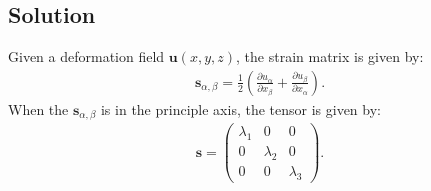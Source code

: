 \documentclass{article}
\begin{document}
\subsection*{Solution}
Given a deformation field $\mathbf{u}(x,y,z)$, the strain matrix is given by:
\begin{align*}
    \mathbf{s}_{\alpha,\beta} = \frac{1}{2}\left(\frac{\partial u_\alpha}{\partial x_\beta} + \frac{\partial u_\beta}{\partial x_\alpha}\right).
\end{align*}When the $\mathbf{s}_{\alpha,\beta}$ is in the principle axis, the tensor is given by:
\begin{align*}
    \mathbf{s} = \begin{pmatrix}
        \lambda_1 & 0& 0\\
        0&\lambda_2&0\\
        0&0&\lambda_3
    \end{pmatrix}.
\end{align*}
\end{document}
